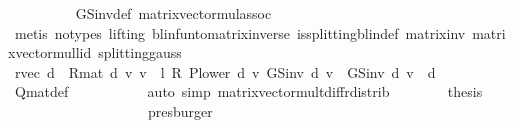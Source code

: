 \begin{isabellebody}
\ \ \ \ \ \ \ \ \isamarkupfalse%
\ GS{\isacharunderscore}{\kern0pt}inv{\isacharunderscore}{\kern0pt}def\ matrix{\isacharunderscore}{\kern0pt}vector{\isacharunderscore}{\kern0pt}mul{\isacharunderscore}{\kern0pt}assoc\isanewline
\ \ \ \ \ \ \ \ \isamarkupfalse%
\ {\isacharparenleft}{\kern0pt}metis\ {\isacharparenleft}{\kern0pt}no{\isacharunderscore}{\kern0pt}types{\isacharcomma}{\kern0pt}\ lifting{\isacharparenright}{\kern0pt}\ blinfun{\isacharunderscore}{\kern0pt}to{\isacharunderscore}{\kern0pt}matrix{\isacharunderscore}{\kern0pt}inverse{\isacharparenleft}{\kern0pt}{}{\isacharparenright}{\kern0pt}\ is{\isacharunderscore}{\kern0pt}splitting{\isacharunderscore}{\kern0pt}blin{\isacharunderscore}{\kern0pt}def{\isacharprime}{\kern0pt}\ matrix{\isacharunderscore}{\kern0pt}inv{\isacharparenleft}{\kern0pt}{}{\isacharparenright}{\kern0pt}\ matrix{\isacharunderscore}{\kern0pt}vector{\isacharunderscore}{\kern0pt}mul{\isacharunderscore}{\kern0pt}lid\ splitting{\isacharunderscore}{\kern0pt}gauss{\isacharparenright}{\kern0pt}\isanewline
\ \ \ \ \ \ \isamarkupfalse%
\ {\isachardoublequoteopen}{\isacharparenleft}{\kern0pt}{\isacharparenleft}{\kern0pt}r{\isacharunderscore}{\kern0pt}vec\ d\ {\isacharplus}{\kern0pt}\ R{\isacharunderscore}{\kern0pt}mat\ d\ {\isacharasterisk}{\kern0pt}v\ v{\isacharparenright}{\kern0pt}\ {\isacharplus}{\kern0pt}\ {\isacharparenleft}{\kern0pt}{\isacharparenleft}{\kern0pt}l\ {\isacharasterisk}{\kern0pt}\isactrlsub R\ P{\isacharunderscore}{\kern0pt}lower\ d{\isacharparenright}{\kern0pt}{\isacharparenright}{\kern0pt}\ {\isacharasterisk}{\kern0pt}v\ GS{\isacharunderscore}{\kern0pt}inv\ d\ v{\isacharparenright}{\kern0pt}\ {\isacharequal}{\kern0pt}\ GS{\isacharunderscore}{\kern0pt}inv\ d\ v{\isachardoublequoteclose}\ \ d\isanewline
\ \ \ \ \ \ \ \ \isamarkupfalse%
\ Q{\isacharunderscore}{\kern0pt}mat{\isacharunderscore}{\kern0pt}def\ \isanewline
\ \ \ \ \ \ \ \ \isamarkupfalse%
\ {\isacharparenleft}{\kern0pt}auto\ simp{\isacharcolon}{\kern0pt}\ matrix{\isacharunderscore}{\kern0pt}vector{\isacharunderscore}{\kern0pt}mult{\isacharunderscore}{\kern0pt}diff{\isacharunderscore}{\kern0pt}rdistrib{\isacharparenright}{\kern0pt}\isanewline
\ \ \ \ \ \ \isamarkupfalse%
\ {\isacharquery}{\kern0pt}thesis\ \isanewline
\ \ \ \ \ \ \ \ \isamarkupfalse%
\ {\isacharasterisk}{\kern0pt}{\isacharasterisk}{\kern0pt}\isanewline
\ \ \ \ \ \ \ \ \isamarkupfalse%
\ presburger\isanewline
\ \ \ \ \isamarkupfalse%

\end{isabellebody}
